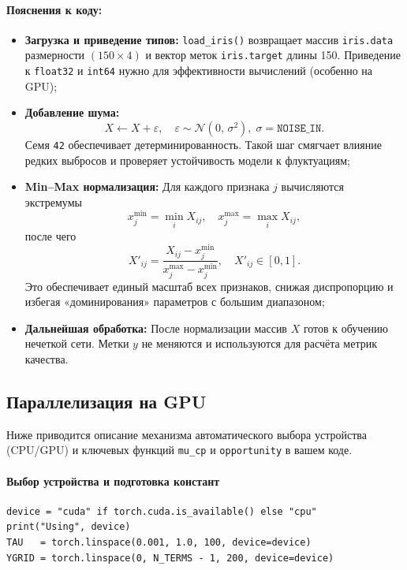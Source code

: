 \paragraph{Пояснения к коду:}
\begin{itemize}
  \item \textbf{Загрузка и приведение типов:}  
    \verb|load_iris()| возвращает массив \verb|iris.data| размерности $(150\times4)$ и вектор меток \verb|iris.target| длины 150.  
    Приведение к \verb|float32| и \verb|int64| нужно для эффективности вычислений (особенно на GPU);
  
  \item \textbf{Добавление шума:}
    \[
      X \leftarrow X + \varepsilon,\quad \varepsilon \sim \mathcal{N}(0,\,\sigma^2),\;
      \sigma=\texttt{NOISE\_IN}.
    \]
    Семя \verb|42| обеспечивает детерминированность. Такой шаг смягчает влияние редких выбросов и проверяет устойчивость модели к флуктуациям;
  
  \item \textbf{Min–Max нормализация:}  
    Для каждого признака $j$ вычисляются экстремумы
    \[
      x_j^{\min} = \min_i X_{ij}, \quad
      x_j^{\max} = \max_i X_{ij},
    \]
    после чего
    \[
      X'_{ij} = \frac{X_{ij} - x_j^{\min}}{x_j^{\max} - x_j^{\min}},\quad
      X'_{ij}\in[0,1].
    \]
    Это обеспечивает единый масштаб всех признаков, снижая диспропорцию и избегая «доминирования» параметров с большим диапазоном;
  
  \item \textbf{Дальнейшая обработка:}  
    После нормализации массив $X$ готов к обучению нечеткой сети. Метки $y$ не меняются и используются для расчёта метрик качества.
\end{itemize}

\subsection{Параллелизация на GPU}

Ниже приводится описание механизма автоматического выбора устройства (CPU/GPU) и ключевых функций \verb|mu_cp| и \verb|opportunity| в вашем коде.

\paragraph{Выбор устройства и подготовка констант}
\begin{verbatim}
device = "cuda" if torch.cuda.is_available() else "cpu"
print("Using", device)
TAU   = torch.linspace(0.001, 1.0, 100, device=device)
YGRID = torch.linspace(0, N_TERMS - 1, 200, device=device)
\end{verbatim}

